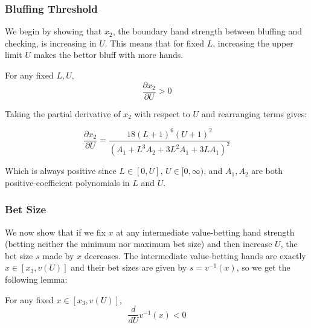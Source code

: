 \documentclass[../../main/main.tex]{subfiles}
\begin{document}
\subsubsection{Bluffing Threshold}

We begin by showing that $x_2$, the boundary hand strength between bluffing and checking, is increasing in $U$. This means that for fixed $L$, increasing the upper limit $U$ makes the bettor bluff with more hands. 

\begin{lemma}
    \label{lem:x2_increasing}
    For any fixed $L, U$,
    $$ \frac{\partial x_2}{\partial U} > 0 $$
\end{lemma}

\begin{customproof}
    Taking the partial derivative of $x_2$ with respect to $U$ and rearranging terms gives:
    
    $$\frac{\partial x_2}{\partial U} = \frac{18 (L+1)^6 (U+1)^2}{\left(A_1 + L^3 A_2 + 3 L^2 A_1 + 3 L A_1 \right)^2}$$

    Which is always positive since $L \in [0, U]$, $U \in [0, \infty)$, and $A_1, A_2$ are both positive-coefficient polynomials in $L$ and $U$.   
\end{customproof}

\subsubsection{Bet Size}

We now show that if we fix $x$ at any intermediate value-betting hand strength (betting neither the minimum nor maximum bet size) and then increase $U$, the bet size $s$ made by $x$ decreases. The intermediate value-betting hands are exactly $x \in [x_3, v(U)]$ and their bet sizes are given by $s = v^{-1}(x)$, so we get the following lemma:

\begin{lemma}
    \label{lem:v_inverse_decreasing}
    For any fixed $x \in [x_3, v(U)]$, 
    \[ 
        \frac{d}{dU} v^{-1}(x) < 0
    \]
\end{lemma}
\end{document}
